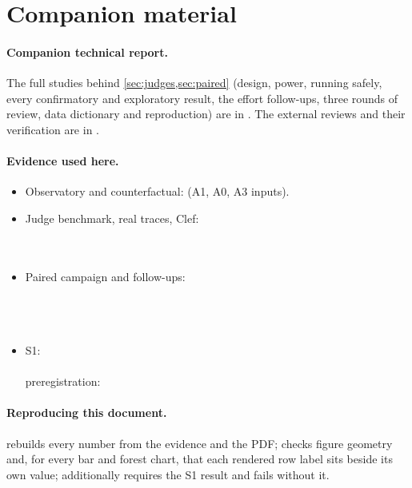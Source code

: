 \section{Companion material}\label{app:companion}

{\raggedright
\paragraph{Companion technical report.} The full studies behind \cref{sec:judges,sec:paired} (design, power,
running safely, every confirmatory and exploratory result, the effort follow-ups, three rounds of review, data
dictionary and reproduction) are in . The external reviews and
their verification are in .\par}

\paragraph{Evidence used here.}\begingroup\raggedright
\begin{itemize}
  \item Observatory and counterfactual:  (A1, A0, A3 inputs).
  \item Judge benchmark, real traces, Clef:\\ \\
    \\ 
  \item Paired campaign and follow-ups:\\ \\
    \\ \\
  \item S1:\\ \\ preregistration: 
\end{itemize}\endgroup

\paragraph{Reproducing this document.}  rebuilds every number from the evidence and the PDF;
 checks figure geometry and, for every bar and forest chart, that each rendered row label sits beside its own value;  additionally requires the S1 result and fails without it.
